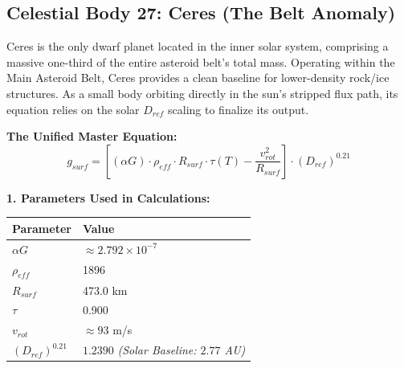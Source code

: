\documentclass[11pt, a4paper]{article}
\begin{document}
\clearpage
\subsection{Celestial Body 27: Ceres (The Belt Anomaly)}
  Ceres is the only dwarf planet located in the inner solar system, comprising a massive one-third of the entire asteroid belt's total mass. Operating within the Main Asteroid Belt, Ceres provides a clean baseline for lower-density rock/ice structures. As a small body orbiting directly in the sun's stripped flux path, its equation relies on the solar $D_{ref}$ scaling to finalize its output.

  \vspace{0.5em}
  \noindent \textbf{The Unified Master Equation:}
  $$ g_{surf} = \left[ (\alpha G) \cdot \rho_{eff} \cdot R_{surf} \cdot \tau(T) - \frac{v_{rot}^2}{R_{surf}} \right] \cdot (D_{ref})^{0.21} $$

  \vspace{0.5em}
  \noindent \textbf{1. Parameters Used in Calculations:} \\[0.5em]
  \begingroup
  \renewcommand{\arraystretch}{1.3}
  \hspace*{2em}
  \begin{tabular}{|l|l|}
    \hline
    \textbf{Parameter} & \textbf{Value} \\ \hline
    $\alpha G$ & $\approx 2.792 \times 10^{-7}$ \\ \hline
    $\rho_{eff}$ & 1896 \\ \hline
    $R_{surf}$ & 473.0 km \\ \hline
    $\tau$ & 0.900 \\ \hline
    $v_{rot}$ & $\approx 93$ m/s \\ \hline
    $(D_{ref})^{0.21}$ & $1.2390$ \textit{(Solar Baseline: $2.77$ AU)} \\ \hline
  \end{tabular}
  \endgroup
\end{document}

